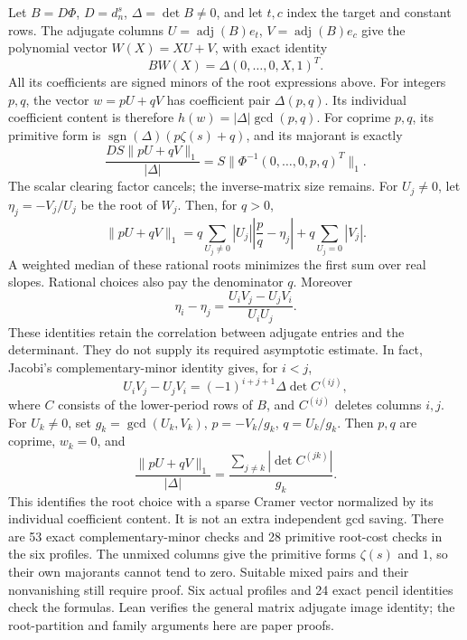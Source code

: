 \documentclass[11pt]{article}
\theoremstyle{remark}
\begin{document}
Let \(B=D\Phi\), \(D=d_n^s\), \(\Delta=\det B\ne0\), and
let \(t,c\) index the target and constant rows. The adjugate columns
\(U=\operatorname{adj}(B)e_t\), \(V=\operatorname{adj}(B)e_c\)
give the polynomial vector \(W(X)=XU+V\), with exact identity
\[
 BW(X)=\Delta(0,\ldots,0,X,1)^T.
\]
All its coefficients are signed minors of the root expressions above.
For integers \(p,q\), the vector \(w=pU+qV\) has coefficient
pair \(\Delta(p,q)\). Its individual coefficient content is therefore
\(h(w)=|\Delta|\gcd(p,q)\). For coprime \(p,q\), its primitive
form is \(\operatorname{sgn}(\Delta)(p\zeta(s)+q)\), and its
majorant is exactly
\[
 \frac{DS\|pU+qV\|_1}{|\Delta|}
   =S\|\Phi^{-1}(0,\ldots,0,p,q)^T\|_1.
\]
The scalar clearing factor cancels; the inverse-matrix size remains.
For \(U_j\ne0\), let \(\eta_j=-V_j/U_j\) be the root of \(W_j\).
Then, for \(q>0\),
\begin{equation}
 \|pU+qV\|_1
 =q\sum_{U_j\ne0}|U_j|\left|\frac pq-\eta_j\right|
   +q\sum_{U_j=0}|V_j|.
 \label{eq:adjugate-root-dispersion}
\end{equation}
A weighted median of these rational roots minimizes the first sum
over real slopes. Rational choices also pay the denominator \(q\).
Moreover
\[
 \eta_i-\eta_j=\frac{U_iV_j-U_jV_i}{U_iU_j}.
\]
These identities retain the correlation between adjugate entries and
the determinant. They do not supply its required asymptotic estimate.
In fact, Jacobi's complementary-minor identity gives, for \(i<j\),
\[
 U_iV_j-U_jV_i=(-1)^{i+j+1}\Delta\det C^{(ij)},
\]
where \(C\) consists of the lower-period rows of \(B\), and
\(C^{(ij)}\) deletes columns \(i,j\). For \(U_k\ne0\), set
\(g_k=\gcd(U_k,V_k)\), \(p=-V_k/g_k\), \(q=U_k/g_k\).
Then \(p,q\) are coprime, \(w_k=0\), and
\[
 \frac{\|pU+qV\|_1}{|\Delta|}
 =\frac{\sum_{j\ne k}|\det C^{(jk)}|}{g_k}.
\]
This identifies the root choice with a sparse Cramer vector normalized
by its individual coefficient content. It is not an extra independent
gcd saving. There are 53 exact complementary-minor checks and 28
primitive root-cost checks in the six profiles.
The unmixed columns give the primitive forms \(\zeta(s)\) and \(1\),
so their own majorants cannot tend to zero. Suitable mixed pairs and
their nonvanishing still require proof. Six actual profiles and 24
exact pencil identities check the formulas. Lean verifies the general
matrix adjugate image identity; the root-partition and family arguments
here are paper proofs.
\end{document}
